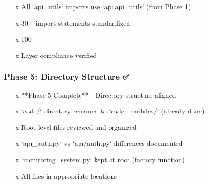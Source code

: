 \documentclass[11pt,a4paper]{article}
\begin{document}
\begin{itemize}
\item [x] All `api_utils` imports use `api.api_utils` (from Phase 1)
\end{itemize}

\begin{itemize}
\item [x] 30+ import statements standardized
\end{itemize}

\begin{itemize}
\item [x] 100%
\end{itemize}

\begin{itemize}
\item [x] Layer compliance verified
\end{itemize}

\subsubsection{Phase 5: Directory Structure ✅}

\begin{itemize}
\item [x] **Phase 5 Complete** - Directory structure aligned
\end{itemize}

\begin{itemize}
\item [x] `code/` directory renamed to `code_modules/` (already done)
\end{itemize}

\begin{itemize}
\item [x] Root-level files reviewed and organized
\end{itemize}

\begin{itemize}
\item [x] `api_auth.py` vs `api/auth.py` differences documented
\end{itemize}

\begin{itemize}
\item [x] `monitoring_system.py` kept at root (factory function)
\end{itemize}

\begin{itemize}
\item [x] All files in appropriate locations
\end{itemize}
\end{document}
